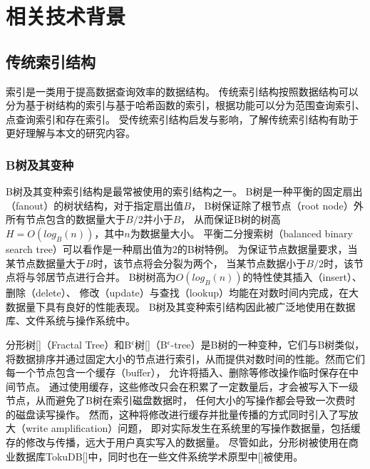 \chapter{相关技术背景}
\label{chap:back}

\section{传统索引结构}

索引是一类用于提高数据查询效率的数据结构。
传统索引结构按照数据结构可以分为基于树结构的索引与基于哈希函数的索引，根据功能可以分为范围查询索引、点查询索引和存在索引。
{\li}受传统索引结构启发与影响，了解传统索引结构有助于更好理解{\li}与本文的研究内容。

\subsection{B树及其变种}

B树及其变种索引结构是最常被使用的索引结构之一\cite{graefe2001b}。
B树是一种平衡的固定扇出（fanout）的树状结构，对于指定扇出值$B$，
B树保证除了根节点（root node）外所有节点包含的数据量大于$B/2$并小于$B$，
从而保证B树的树高$H=O(log_B(n))$，其中$n$为数据量大小。
平衡二分搜索树（balanced binary search tree）可以看作是一种扇出值为$2$的B树特例。
为保证节点数据量要求，当某节点数据量大于$B$时，该节点将会分裂为两个，
当某节点数据小于$B/2$时，该节点将与邻居节点进行合并。
B树树高为$O(log_B(n))$的特性使其插入（insert）、删除（delete）、
修改（update）与查找（lookup）均能在对数时间内完成，在大数据量下具有良好的性能表现。
B树及其变种索引结构因此被广泛地使用在数据库、文件系统与操作系统中。


分形树[]（Fractal Tree）和B$^\epsilon$树[]（B$^\epsilon$-tree）是B树的一种变种，它们与B树类似，
将数据排序并通过固定大小的节点进行索引，从而提供对数时间的性能。然而它们每一个节点包含一个缓存（buffer），
允许将插入、删除等修改操作临时保存在中间节点。
通过使用缓存，这些修改只会在积累了一定数量后，才会被写入下一级节点，从而避免了B树在索引磁盘数据时，
任何大小的写操作都会导致一次费时的磁盘读写操作。
然而，这种将修改进行缓存并批量传播的方式同时引入了写放大（write amplification）问题，
即对实际发生在系统里的写操作数据量，包括缓存的修改与传播，远大于用户真实写入的数据量。
尽管如此，分形树被使用在商业数据库TokuDB[]中，同时也在一些文件系统学术原型中[]被使用。

